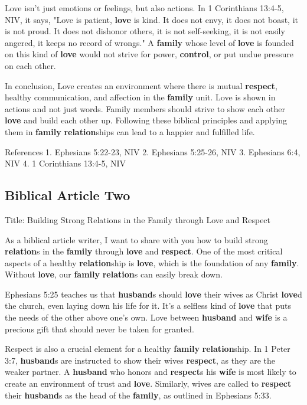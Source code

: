 \documentclass{article}
\begin{document}
Love isn't just emotions or feelings, but also actions. In 1 Corinthians 13:4-5, NIV, it says, "Love is patient, \textbf{\textbf{love}} is kind. It does not envy, it does not boast, it is not proud. It does not dishonor others, it is not self-seeking, it is not easily angered, it keeps no record of wrongs." A \textbf{\textbf{family}} whose level of \textbf{\textbf{love}} is founded on this kind of \textbf{\textbf{love}} would not strive for power, \textbf{\textbf{control}}, or put undue pressure on each other.

In conclusion, Love creates an environment where there is mutual \textbf{\textbf{respect}}, healthy communication, and affection in the \textbf{\textbf{family}} unit. Love is shown in actions and not just words. Family members should strive to show each other \textbf{\textbf{love}} and build each other up. Following these biblical principles and applying them in \textbf{\textbf{family}} \textbf{\textbf{relation}}ships can lead to a happier and fulfilled life.

References
1. Ephesians 5:22-23, NIV
2. Ephesians 5:25-26, NIV
3. Ephesians 6:4, NIV
4. 1 Corinthians 13:4-5, NIV

\subsection{Biblical Article Two}
Title: Building Strong Relations in the Family through Love and Respect

As a biblical article writer, I want to share with you how to build strong \textbf{\textbf{relation}}s in the \textbf{\textbf{family}} through \textbf{\textbf{love}} and \textbf{\textbf{respect}}. One of the most critical aspects of a healthy \textbf{\textbf{relation}}ship is \textbf{\textbf{love}}, which is the foundation of any \textbf{\textbf{family}}. Without \textbf{\textbf{love}}, our \textbf{\textbf{family}} \textbf{\textbf{relation}}s can easily break down.

Ephesians 5:25 teaches us that \textbf{\textbf{husband}}s should \textbf{\textbf{love}} their wives as Christ \textbf{\textbf{love}}d the church, even laying down his life for it. It's a selfless kind of \textbf{\textbf{love}} that puts the needs of the other above one's own. Love between \textbf{\textbf{husband}} and \textbf{\textbf{wife}} is a precious gift that should never be taken for granted.

Respect is also a crucial element for a healthy \textbf{\textbf{family}} \textbf{\textbf{relation}}ship. In 1 Peter 3:7, \textbf{\textbf{husband}}s are instructed to show their wives \textbf{\textbf{respect}}, as they are the weaker partner. A \textbf{\textbf{husband}} who honors and \textbf{\textbf{respect}}s his \textbf{\textbf{wife}} is most likely to create an environment of trust and \textbf{\textbf{love}}. Similarly, wives are called to \textbf{\textbf{respect}} their \textbf{\textbf{husband}}s as the head of the \textbf{\textbf{family}}, as outlined in Ephesians 5:33.
\end{document}
